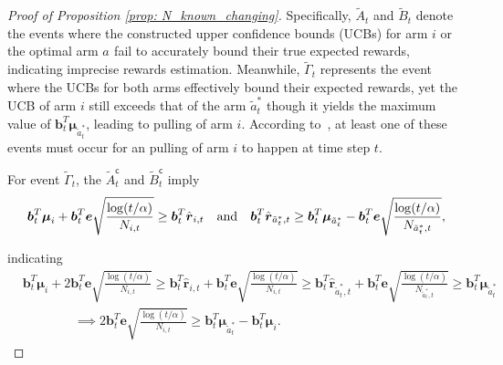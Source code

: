 \begin{proof}[Proof of Proposition \ref{prop: N_known_changing}]
Specifically, $\tilde{A}_t$ and $\tilde{B}_t$ denote the events where the constructed upper confidence bounds (UCBs) for arm $i$ or the optimal arm $a^{}$ fail to accurately bound their true expected rewards, indicating imprecise rewards estimation. Meanwhile, $\tilde{\Gamma}_t$ represents the event where the UCBs for both arms effectively bound their expected rewards, yet the UCB of arm $i$ still exceeds that of the arm $\tilde{a}_{t}^{*}$ though it yields the maximum value of $\boldsymbol{b}_t^T \boldsymbol{\mu}_{\tilde{a}_{t}^{*}}$, leading to pulling of arm $i$. According to~\citep{auer2002finite}, at least one of these events must occur for an pulling of arm $i$ to happen at time step $t$.

For event $\tilde{\Gamma}_t$, the $\tilde{A}_t^{\mathsf{c}}$ and $\tilde{B}_t^{\mathsf{c}}$ imply
\[
\boldsymbol{b}_{t}^{T} \boldsymbol{\mu}_{i} + \boldsymbol{b}_{t}^{T} \boldsymbol{e} \sqrt{\frac{ \log(t/\alpha)}{N_{i,t}}}
\geq
\boldsymbol{b}_{t}^{T} \hat{\boldsymbol{r}}_{i,t}
\quad \text{and} \quad
\boldsymbol{b}_{t}^{T} \hat{\boldsymbol{r}}_{\tilde{a}_{t}^{*},t} \geq \boldsymbol{b}_{t}^{T} \boldsymbol{\mu}_{\tilde{a}_{t}^{*}} - \boldsymbol{b}_{t}^{T} \boldsymbol{e} \sqrt{\frac{ \log(t/\alpha)}{N_{\tilde{a}_{t}^{*},t}}}, \\
\]

indicating 
\[
\begin{aligned}
& \boldsymbol{b}_{t}^{T} \boldsymbol{\mu}_{i} + 2 \boldsymbol{b}_{t}^{T} \boldsymbol{e} \sqrt{\frac{ \log(t/\alpha)}{N_{i,t}}}
\geq
\boldsymbol{b}_{t}^{T} \hat{\boldsymbol{r}}_{i,t} + \boldsymbol{b}_{t}^{T} \boldsymbol{e} \sqrt{\frac{ \log(t/\alpha)}{N_{i,t}}} 
\geq
\boldsymbol{b}_{t}^{T} \hat{\boldsymbol{r}}_{\tilde{a}_{t}^{*},t} + \boldsymbol{b}_{t}^{T} \boldsymbol{e} \sqrt{\frac{ \log(t/\alpha)}{N_{\tilde{a}_{t}^{*},t}}}
\geq
\boldsymbol{b}_{t}^{T} \boldsymbol{\mu}_{\tilde{a}_{t}^{*}} \\
& \qquad \qquad \implies
2 \boldsymbol{b}_{t}^{T} \boldsymbol{e} \sqrt{\frac{ \log(t/\alpha)}{N_{i,t}}} 
\geq
\boldsymbol{b}_{t}^{T} \boldsymbol{\mu}_{\tilde{a}_{t}^{*}} - \boldsymbol{b}_{t}^{T} \boldsymbol{\mu}_{i}.
\end{aligned}
\]


\end{proof}
